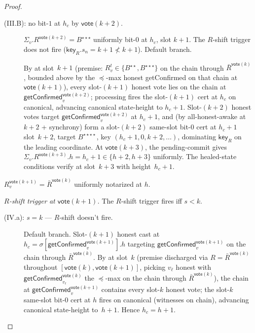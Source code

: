 \ifx\litemode\undefined\documentclass{article}\fi
\newcommand{\key}{\mathsf{key}}
\newcommand{\vote}{\mathsf{vote}}
\newcommand{\comm}[1]{\bar{#1}}
\newcommand{\getConfirmed}{\textsf{getConfirmed}\xspace}
\theoremstyle{plain}
\theoremstyle{definition}
\theoremstyle{remark}
\newcommand{\AHA}{all-honest-awake\xspace}
\begin{document}
\begin{proof}
\begin{description}
\begin{description}
\item[{(III.B): no bit-$1$ at $h_c$ by $\vote(k+2)$.}]\hfill

$\Sigma_v.R^{\vote(k+2)} = B^{\star\star\star}$ uniformly bit-$0$ at $h_c$, slot $k+1$. The $R$-shift trigger does not fire ($\key_R.s_n = k+1 \not< k+1$). Default branch.

By  at slot~$k+1$ (premise: $R_v^t \in \{B^{\star\star}, B^{\star\star\star}\}$ on the chain through $\comm{R}^{\vote(k)}$, bounded above by the $\preceq$-max honest \getConfirmed{} on that chain at $\vote(k+1)$), every slot-$(k+1)$ honest vote lies on the chain at $\getConfirmed_v^{\vote(k+2)}$; processing fires the slot-$(k+1)$ cert at $h_c$ on canonical, advancing canonical state-height to $h_c + 1$. Slot-$(k+2)$ honest votes target $\getConfirmed_v^{\vote(k+2)}$ at $h_c + 1$, and (by \AHA at $k+2$ + synchrony) form a slot-$(k+2)$ same-slot bit-$0$ cert at $h_c + 1$ slot~$k+2$, target $B^{\star\star\star\star}$, key $(h_c+1, 0, k+2, \ldots)$, dominating $\key_R$ on the leading coordinate. At $\vote(k+3)$, the pending-commit gives $\Sigma_v.R^{\vote(k+3)}.h = h_c + 1 \in \{h+2, h+3\}$ uniformly. The healed-state conditions verify at slot~$k+3$ with height~$h_c + 1$.
\end{description}

\item[{Case (IV): $\key_R$ is $(h, 0, s, \comm{R}^{\vote(k)})$ with $s \in [s_v, k]$.}]\hfill

$R_v^{\vote(k+1)} = \comm{R}^{\vote(k)}$ uniformly notarized at $h$.

\emph{$R$-shift trigger at $\vote(k+1)$.}
The $R$-shift trigger fires iff $s < k$.

\begin{description}
\item[{(IV.a): $s = k$ — $R$-shift doesn't fire.}]\hfill

Default branch. Slot-$(k+1)$ honest cast at $h_c = \sigma[\getConfirmed_v^{\vote(k+1)}].h$ targeting $\getConfirmed_v^{\vote(k+1)}$ on the chain through $\comm{R}^{\vote(k)}$. By  at slot~$k$ (premise discharged via $R = \comm{R}^{\vote(k)}$ throughout $[\vote(k), \vote(k+1)]$, picking $v_\ell$ honest with $\getConfirmed_{v_\ell}^{\vote(k)}$ the $\preceq$-max on the chain through $\comm{R}^{\vote(k)}$), the chain at $\getConfirmed_v^{\vote(k+1)}$ contains every slot-$k$ honest vote; the slot-$k$ same-slot bit-$0$ cert at $h$ fires on canonical (witnesses on chain), advancing canonical state-height to~$h+1$. Hence $h_c = h+1$.


\end{description}
\end{description}
\end{proof}
\end{document}
